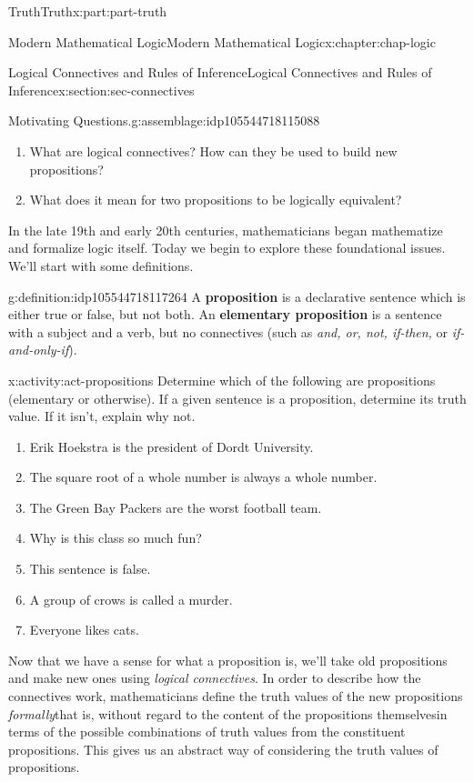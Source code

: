 \documentclass[oneside,10pt,]{book}
\newcommand{\terminology}[1]{\textbf{#1}}
\numberwithin{equation}{section}
\begin{document}
\begin{partptx}{Truth}{}{Truth}{}{}{x:part:part-truth}
\begin{chapterptx}{Modern Mathematical Logic}{}{Modern Mathematical Logic}{}{}{x:chapter:chap-logic}
\begin{sectionptx}{Logical Connectives and Rules of Inference}{}{Logical Connectives and Rules of Inference}{}{}{x:section:sec-connectives}
\begin{assemblage}{Motivating Questions.}{g:assemblage:idp105544718115088}
\begin{enumerate}
\item{}What are logical connectives? How can they be used to build new propositions?%
\item{}What does it mean for two propositions to be logically equivalent?%
\end{enumerate}
%
\end{assemblage}
In the late 19th and early 20th centuries, mathematicians began mathematize and formalize logic itself. Today we begin to explore these foundational issues. We'll start with some definitions.%
\begin{definition}{}{g:definition:idp105544718117264}%
%
%
%
A \terminology{proposition} is a declarative sentence which is either true or false, but not both. An \terminology{elementary proposition} is a sentence with a subject and a verb, but no connectives (such as \emph{and, or, not, if-then,} or \emph{if-and-only-if}).%
\end{definition}
\begin{activity}{}{x:activity:act-propositions}%
Determine which of the following are propositions (elementary or otherwise). If a given sentence is a proposition, determine its truth value. If it isn't, explain why not.%
%
\begin{enumerate}
\item{}Erik Hoekstra is the president of Dordt University.%
\item{}The square root of a whole number is always a whole number.%
\item{}The Green Bay Packers are the worst football team.%
\item{}Why is this class so much fun?%
\item{}This sentence is false.%
\item{}A group of crows is called a murder.%
\item{}Everyone likes cats.%
\end{enumerate}
\end{activity}%
Now that we have a sense for what a proposition is, we'll take old propositions and make new ones using \emph{logical connectives}. In order to describe how the connectives work, mathematicians define the truth values of the new propositions \emph{formally}\textemdash{}that is, without regard to the content of the propositions themselves\textemdash{}in terms of the possible combinations of truth values from the constituent propositions. This gives us an abstract way of considering the truth values of propositions.%

\end{sectionptx}
\end{chapterptx}
\end{partptx}
\end{document}
